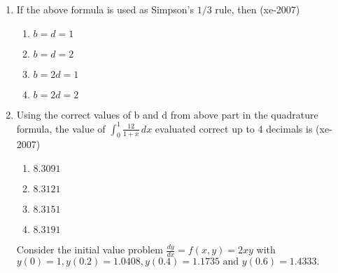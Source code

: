 \documentclass[journal,12pt,onecolumn]{IEEEtran}
\theoremstyle{remark}
\begin{document}
\begin{enumerate}
    \item If the above formula is used as Simpson's $1/3$ rule, then
    \hfill{(xe-2007)}
    \begin{multicols}{4}
    \begin{enumerate}
    \item $b=d=1$
    \item $b=d=2$
    \item $b=2d=1$
    \item $b=2d=2$
    \end{enumerate}
    \end{multicols}
    \item Using the correct values of b and d from above part in the quadrature formula, the value of $\int_{0}^{1} \frac{12}{1+x} \, dx$ evaluated correct up to 4 decimals is
    \hfill{(xe-2007)}
    \begin{multicols}{4}
    \begin{enumerate}
    \item $8.3091$
    \item $8.3121$
    \item $8.3151$
    \item $8.3191$
    \end{enumerate}
    \end{multicols}
    
    Consider the initial value problem $\frac{dy}{dx} = f(x,y) = 2xy$ with $y(0)=1, y(0.2) = 1.0408, y(0.4) = 1.1735 \text{ and } y(0.6) = 1.4333.$ \\
    

\end{enumerate}
\end{document}
